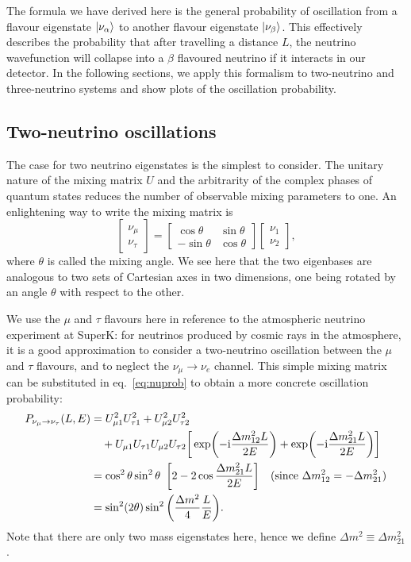 The formula we have derived here is the general probability of oscillation from a
flavour eigenstate $\ket{\nu_\alpha}$ to another flavour eigenstate
$\ket{\nu_\beta}$. This effectively describes the probability that after
travelling a distance $L$, the neutrino wavefunction will collapse into a
$\beta$ flavoured neutrino if it interacts in our detector.
In the following sections, we apply this formalism to two-neutrino and
three-neutrino systems and show plots of the oscillation probability.



\subsection{Two-neutrino oscillations}\label{sec:twonu}
The case for two neutrino eigenstates is the simplest to consider. The
unitary nature of the mixing matrix $U$ and the arbitrarity of the complex phases
of quantum states reduces the number of observable mixing parameters to
one\cite{langacker}.
An enlightening way to write the mixing matrix is\cite{zuber} 
\begin{equation}
	\begin{bmatrix} \nu_\mu \\ \nu_\tau \end{bmatrix} =
	\begin{bmatrix} \cos\theta & \sin\theta \\
								 -\sin\theta & \cos\theta \end{bmatrix}
	\begin{bmatrix} \nu_1 \\ \nu_2 \end{bmatrix},
		\label{eq:twonumixing}
\end{equation}
where $\theta$ is called the mixing angle.
We see here that the two eigenbases are analogous to two sets of Cartesian axes
in two dimensions, one being rotated by an angle $\theta$ with respect to the
other.

We use the $\mu$ and $\tau$ flavours here in reference to the
atmospheric neutrino experiment at SuperK\cite{superk}: for neutrinos produced
by cosmic rays in the atmosphere, it is a good approximation to consider a
two-neutrino oscillation between the $\mu$ and $\tau$ flavours, and to neglect
the $\nu_\mu \rightarrow \nu_e$ channel. 
This simple mixing matrix can be substituted in eq.~\ref{eq:nuprob} to obtain a
more concrete oscillation probability:
\begin{align}
	P_{\nu_\mu \rightarrow \nu_\tau}(L, E) &= U_{\mu 1}^2 U_{\tau 1}^2 + U_{\mu 2}^2
	U_{\tau 2}^2 \nonumber\\&\quad+ U_{\mu 1} U_{\tau 1} U_{\mu 2} U_{\tau 2} \bigg[\exp(-\mathrm{i}
	\frac{\Delta m_{12}^2 L}{2 E}) + \exp(-\mathrm{i} \frac{\Delta m_{21}^2 L}{2
	E})\bigg]\nonumber\\
	&= \cos^2\theta \sin^2\theta\enskip \bigg[2 - 2\cos\frac{\Delta m_{21}^2 L}{2
	E}\bigg]\quad\text{(since $\Delta m_{12}^2 = -\Delta m_{21}^2$)}\nonumber\\
	&= \sin^2(2\theta)\sin^2\bigg(\frac{\Delta m^2}{4}
	\frac{L}{E}\bigg).\label{eq:twonu}
\end{align}
Note that there are only two mass eigenstates here, hence we define $\Delta m^2
\equiv \Delta m_{21}^2$.

